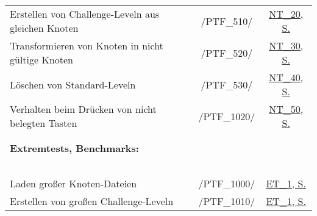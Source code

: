 \begin{longtable}{p{0.5\hsize}p{0.275\hsize}p{0.275\hsize}}
	  \multicolumn{1}{L{6.5cm}}{Erstellen von Challenge-Leveln aus gleichen Knoten}
	& \multicolumn{1}{c}{/PTF\_510/}
	& \multicolumn{1}{c}{\hyperref[NT:20]{NT\_20, S. \pageref{NT:20}}}
	
	\\
	
	  \multicolumn{1}{L{6.5cm}}{Transformieren von Knoten in nicht gültige Knoten}
	& \multicolumn{1}{c}{/PTF\_520/}
	& \multicolumn{1}{c}{\hyperref[NT:30]{NT\_30, S. \pageref{NT:30}}}
	
	\\
	
	  \multicolumn{1}{L{6.5cm}}{Löschen von Standard-Leveln}
	& \multicolumn{1}{c}{/PTF\_530/}
	& \multicolumn{1}{c}{\hyperref[NT:40]{NT\_40, S. \pageref{NT:40}}}
	
	\\
	
	  \multicolumn{1}{L{6.5cm}}{Verhalten beim Drücken von nicht belegten Tasten}
	& \multicolumn{1}{c}{/PTF\_1020/}
	& \multicolumn{1}{c}{\hyperref[NT:50]{NT\_50, S. \pageref{NT:50}}}
	
	\\
	\\
	\\
	
	
	

	  \multicolumn{3}{l}{\textbf{Extremtests, Benchmarks:}}
	  
	\\
	
	  \multicolumn{3}{l}{~}
	  
	\\
	
	  \multicolumn{1}{L{6.5cm}}{Laden großer Knoten-Dateien}
	& \multicolumn{1}{c}{/PTF\_1000/}
	& \multicolumn{1}{c}{\hyperref[Abschnitt:Tests:Protokoll:Extrem:Knoten_Erzeugen]{ET\_1, S. \pageref{Abschnitt:Tests:Protokoll:Extrem:Knoten_Erzeugen}}}
	
	\\
	
	  \multicolumn{1}{L{6.5cm}}{Erstellen von großen Challenge-Leveln}
	& \multicolumn{1}{c}{/PTF\_1010/}
	& \multicolumn{1}{c}{\hyperref[Abschnitt:Tests:Protokoll:Extrem:Knoten_Erzeugen]{ET\_1, S. \pageref{Abschnitt:Tests:Protokoll:Extrem:Knoten_Erzeugen}}}
	
	\\
	
	
	
\end{longtable}


